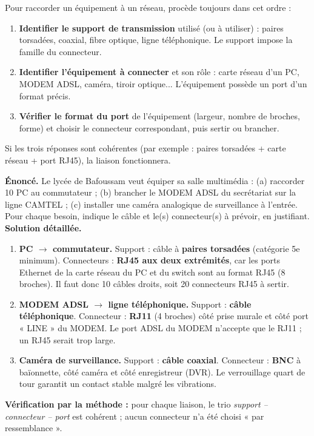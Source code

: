\documentclass[11pt]{article}
\newcounter{popsec}
\newcounter{popsub}
\newcommand{\courssub}[1]{%
  \stepcounter{popsub}%
  \par\vspace{9pt}\noindent{\popxbold\fontsize{11.5}{13}\selectfont\color{popink}{\color{poporange}\thepopsec.\thepopsub}\hspace{6pt}#1}\par\nopagebreak\vspace{4pt}
}
\begin{document}
\courssub{Méthode de choix d'un connecteur}

\begin{methode}
Pour raccorder un équipement à un réseau, procède toujours dans cet ordre :
\begin{enumerate}
\item \textbf{Identifier le support de transmission} utilisé (ou à utiliser) : paires torsadées, coaxial, fibre optique, ligne téléphonique. Le support impose la famille du connecteur.
\item \textbf{Identifier l'équipement à connecter} et son rôle : carte réseau d'un PC, MODEM ADSL, caméra, tiroir optique... L'équipement possède un port d'un format précis.
\item \textbf{Vérifier le format du port} de l'équipement (largeur, nombre de broches, forme) et choisir le connecteur correspondant, puis sertir ou brancher.
\end{enumerate}
Si les trois réponses sont cohérentes (par exemple : paires torsadées + carte réseau + port RJ45), la liaison fonctionnera.
\end{methode}

\begin{exoresolu}
\textbf{Énoncé.} Le lycée de Bafoussam veut équiper sa salle multimédia : (a) raccorder 10 PC au commutateur ; (b) brancher le MODEM ADSL du secrétariat sur la ligne CAMTEL ; (c) installer une caméra analogique de surveillance à l'entrée. Pour chaque besoin, indique le câble et le(s) connecteur(s) à prévoir, en justifiant.
\tcblower
\textbf{Solution détaillée.}
\begin{enumerate}
\item \textbf{PC $\rightarrow$ commutateur.} Support : câble à \textbf{paires torsadées} (catégorie 5e minimum). Connecteurs : \textbf{RJ45 aux deux extrémités}, car les ports Ethernet de la carte réseau du PC et du switch sont au format RJ45 (8 broches). Il faut donc 10 câbles droits, soit 20 connecteurs RJ45 à sertir.
\item \textbf{MODEM ADSL $\rightarrow$ ligne téléphonique.} Support : \textbf{câble téléphonique}. Connecteur : \textbf{RJ11} (4 broches) côté prise murale et côté port « LINE » du MODEM. Le port ADSL du MODEM n'accepte que le RJ11 ; un RJ45 serait trop large.
\item \textbf{Caméra de surveillance.} Support : \textbf{câble coaxial}. Connecteur : \textbf{BNC} à baïonnette, côté caméra et côté enregistreur (DVR). Le verrouillage quart de tour garantit un contact stable malgré les vibrations.
\end{enumerate}
\textbf{Vérification par la méthode :} pour chaque liaison, le trio \emph{support -- connecteur -- port} est cohérent ; aucun connecteur n'a été choisi « par ressemblance ».
\end{exoresolu}
\end{document}
